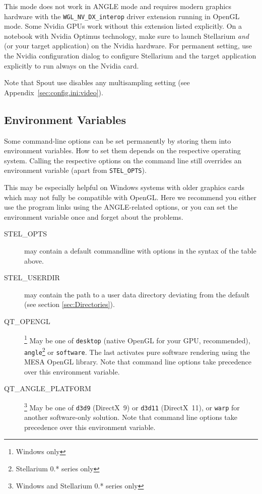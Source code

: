 This mode does not work in ANGLE mode and requires modern graphics hardware with the \texttt{WGL\_NV\_DX\_interop} 
driver extension running in OpenGL mode. Some Nvidia GPUs work without this extension listed explicitly. 
On a notebook with Nvidia Optimus technology, make sure to launch Stellarium \emph{and}  
(or your target application) on the Nvidia hardware. 
For permanent setting, use the Nvidia configuration dialog to configure Stellarium and the target application explicitly to run always on the Nvidia card.

Note that Spout use disables any multisampling setting (see Appendix~\ref{sec:config.ini:video}). 

\subsection{Environment Variables}
\label{sec:Environment}

Some command-line options can be set permanently by storing them into
environment variables. How to set them depends on the respective
operating system. Calling the respective options on the command line
still overrides an environment variable (apart from
\texttt{STEL\_OPTS}).

This may be especially helpful on Windows systems with older graphics
cards which may not fully be compatible with OpenGL. Here we recommend
you either use the program links using the ANGLE-related options, or
you can set the environment variable once and forget about the
problems.

\begin{description}
\item[STEL\_OPTS] may contain a default commandline with options in the syntax of the table above.
\item[STEL\_USERDIR] may contain the path to a user data directory
  deviating from the default (see section \ref{sec:Directories}).
\item[QT\_OPENGL]\footnote{Windows only} May be one of \texttt{desktop} (native OpenGL for your GPU, recommended),
  \texttt{angle}\footnote{Stellarium 0.* series only} or \texttt{software}. The last activates pure software rendering using the MESA OpenGL library. Note that command line options take precedence over this environment variable.
\item[QT\_ANGLE\_PLATFORM]\footnote{Windows and Stellarium 0.* series only} May be one of \texttt{d3d9} (DirectX~9) or \texttt{d3d11} (DirectX~11),
  or \texttt{warp} for another software-only solution. Note that command line options take precedence over this environment variable.
\end{description}

